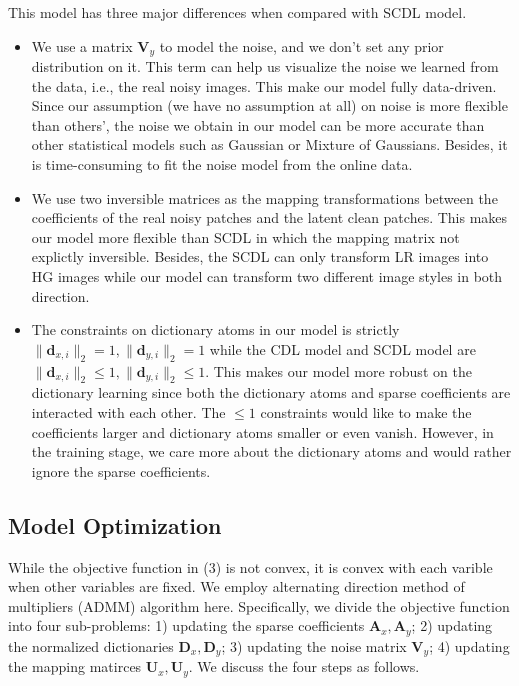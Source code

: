 \documentclass[10pt,twocolumn,letterpaper]{article}
\begin{document}
This model has three major differences when compared with SCDL model.
\begin{itemize}
\item We use a matrix $\bm{V}_{y}$ to model the noise, and we don't set any prior distribution on it. This term can help us visualize the noise we learned from the data, i.e., the real noisy images. This make our model fully data-driven. Since our assumption (we have no assumption at all) on noise is more flexible than others', the noise we obtain in our model can be more accurate than other statistical models such as Gaussian or Mixture of Gaussians. Besides, it is time-consuming to fit the noise model from the online data. 
\item We use two inversible matrices as the mapping transformations between the coefficients of the real noisy patches and the latent clean patches. This makes our model more flexible than SCDL in which the mapping matrix not explictly inversible. Besides, the SCDL can only transform LR images into HG images while our model can transform two different image styles in both direction.
\item The constraints on dictionary atoms in our model is strictly $\|\bm{d}_{x,i}\|_{2}=1, \|\bm{d}_{y,i}\|_{2}=1$ while the CDL model and SCDL model are $\|\bm{d}_{x,i}\|_{2}\le1, \|\bm{d}_{y,i}\|_{2}\le1$. This makes our model more robust on the dictionary learning since both the dictionary atoms and sparse coefficients are interacted with each other. The $\le1$ constraints would like to make the coefficients larger and dictionary atoms smaller or even vanish. However, in the training stage, we care more about the dictionary atoms and would rather ignore the sparse coefficients.  
\end{itemize}

\subsection{Model Optimization}
While the objective function in (3) is not convex, it is convex with each varible when other variables are fixed. We employ alternating direction method of multipliers (ADMM) algorithm here. Specifically, we divide the objective function into four sub-problems: 1) updating the sparse coefficients $\bm{A}_{x}, \bm{A}_{y}$; 2) updating the normalized dictionaries $\bm{D}_{x}, \bm{D}_{y}$; 3) updating the noise matrix $\bm{V}_{y}$; 4) updating the mapping matirces $\bm{U}_{x}, \bm{U}_{y}$. We discuss the four steps as follows.
\end{document}
